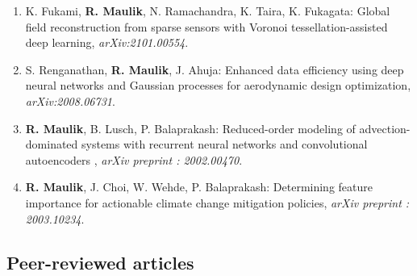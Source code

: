 \documentclass[letterpaper]{article}
\begin{document}
\begin{enumerate}

\item K. Fukami, \textbf{R. Maulik}, N. Ramachandra, K. Taira, K. Fukagata: Global field reconstruction from sparse sensors with Voronoi tessellation-assisted deep learning, {\it arXiv:2101.00554}.

\item S. Renganathan, \textbf{R. Maulik}, J. Ahuja: Enhanced data efficiency using deep neural networks and Gaussian processes for aerodynamic design optimization, {\it arXiv:2008.06731}.

\item \textbf{R. Maulik}, B. Lusch, P. Balaprakash: Reduced-order modeling of advection-dominated systems with recurrent neural networks and convolutional autoencoders , {\it arXiv preprint : 2002.00470}.

\item \textbf{R. Maulik}, J. Choi,  W. Wehde, P. Balaprakash: Determining feature importance for actionable climate change mitigation policies, {\it arXiv preprint : 2003.10234}.

\end{enumerate}

\subsection*{Peer-reviewed articles}
\end{document}
